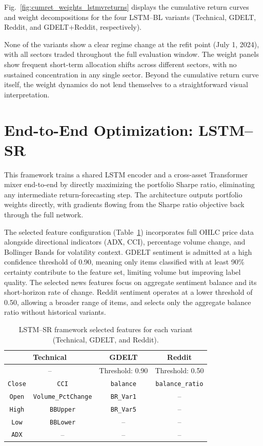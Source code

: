 Fig.~\ref{fig:cumret_weights_lstmvreturns} displays the cumulative return curves and weight decompositions for the four LSTM--BL variants (Technical, GDELT, Reddit, and GDELT+Reddit, respectively).

None of the variants show a clear regime change at the refit point (July 1, 2024), with all sectors traded throughout the full evaluation window. The weight panels show frequent short-term allocation shifts across different sectors, with no sustained concentration in any single sector. Beyond the cumulative return curve itself, the weight dynamics do not lend themselves to a straightforward visual interpretation.



\section{End-to-End Optimization: LSTM--SR}

This framework trains a shared LSTM encoder and a cross-asset Transformer mixer end-to-end by directly maximizing the portfolio Sharpe ratio, eliminating any intermediate return-forecasting step. The architecture outputs portfolio weights directly, with gradients flowing from the Sharpe ratio objective back through the full network.

The selected feature configuration (Table~\ref{tab:lstmvsharpe_features}) incorporates full OHLC price data alongside directional indicators (ADX, CCI), percentage volume change, and Bollinger Bands for volatility context. GDELT sentiment is admitted at a high confidence threshold of 0.90, meaning only items classified with at least 90\% certainty contribute to the feature set, limiting volume but improving label quality. The selected news features focus on aggregate sentiment balance and its short-horizon rate of change. Reddit sentiment operates at a lower threshold of 0.50, allowing a broader range of items, and selects only the aggregate balance ratio without historical variants.

\begin{table}[ht]
\centering
\caption{LSTM--SR framework selected features for each variant (Technical, GDELT, and Reddit).}
\label{tab:lstmvsharpe_features}
\renewcommand{\arraystretch}{1.2}
\begin{tabular}{|cc|c|c|}
\hline
\multicolumn{2}{|c|}{\textbf{Technical}} & \textbf{GDELT} & \textbf{Reddit} \\
\hline
\multicolumn{2}{|c|}{--} & Threshold: 0.90 & Threshold: 0.50 \\
\hline
\texttt{Close} & \texttt{CCI} & \texttt{balance} & \texttt{balance\_ratio} \\
\texttt{Open} & \texttt{Volume\_PctChange} & \texttt{BR\_Var1} & -- \\
\texttt{High} & \texttt{BBUpper} & \texttt{BR\_Var5} & -- \\
\texttt{Low} & \texttt{BBLower} & -- & -- \\
\texttt{ADX} & -- & -- & -- \\
\hline
\end{tabular}
\end{table}

